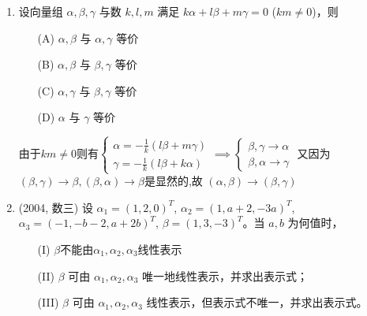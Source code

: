 \documentclass[12pt, a4paper, oneside, UTF8]{ctexbook}
\begin{document}
\begin{enumerate}[label=\arabic*.]
    \item 设向量组 $\alpha, \beta, \gamma$ 与数 $k, l, m$ 满足 $k\alpha + l\beta + m\gamma = 0$ ($km \neq 0$)，则
    \begin{enumerate}
        \item [(A)] $\alpha, \beta$ 与 $\alpha, \gamma$ 等价
        \item [(B)] $\alpha, \beta$ 与 $\beta, \gamma$ 等价
        \item [(C)] $\alpha, \gamma$ 与 $\beta, \gamma$ 等价
        \item [(D)] $\alpha$ 与 $\gamma$ 等价
    \end{enumerate}
    
    \begin{solution}
    由于$km\neq 0$则有$\begin{cases}
        \alpha = -\frac{1}{k}\left(l\beta+m\gamma\right) \\
        \gamma = -\frac{1}{k}\left(l\beta+k\alpha\right) 
    \end{cases} \implies \begin{cases}
        \beta,\gamma \rightarrow \alpha \\
        \beta,\alpha \rightarrow \gamma 
    \end{cases}$
    又因为$(\beta,\gamma) \rightarrow \beta,(\beta,\alpha) \rightarrow \beta $是显然的,故
    $(\alpha,\beta)\rightarrow(\beta,\gamma)$
    \end{solution}
    
    \item (2004, 数三) 设 $\alpha_1 = (1,2,0)^T$, $\alpha_2 = (1, a+2, -3a)^T$, $\alpha_3 = (-1, -b-2, a+2b)^T$,
    $\beta = (1,3,-3)^T$。当 $a, b$ 为何值时，
    \begin{enumerate}
        \item [(I)] $\beta$不能由$\alpha_1, \alpha_2, \alpha_3$线性表示
        \item [(II)] $\beta$ 可由 $\alpha_1, \alpha_2, \alpha_3$ 唯一地线性表示，并求出表示式；
        \item [(III)] $\beta$ 可由 $\alpha_1, \alpha_2, \alpha_3$ 线性表示，但表示式不唯一，并求出表示式。
    \end{enumerate}
    

\end{enumerate}
\end{document}
